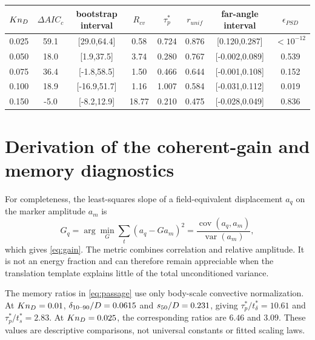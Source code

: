 \begin{center}
\label{tab:fullcov}
\scriptsize
\begin{tabular}{cccccccc}
\toprule
$Kn_D$ & $\Delta AIC_c$ & bootstrap interval & $R_{cv}$ & $\tau_p^*$ & $r_{unif}$ & far-angle interval & $\epsilon_{PSD}$\\
\midrule
0.025 & 59.1 & [29.0,64.4] & 0.58 & 0.724 & 0.876 & [0.120,0.287] & $<10^{-12}$\\
0.050 & 18.0 & [1.9,37.5] & 3.74 & 0.280 & 0.767 & [-0.002,0.089] & 0.539\\
0.075 & 36.4 & [-1.8,58.5] & 1.50 & 0.466 & 0.644 & [-0.001,0.108] & 0.152\\
0.100 & 18.9 & [-16.9,51.7] & 1.16 & 1.007 & 0.584 & [-0.031,0.112] & 0.019\\
0.150 & -5.0 & [-8.2,12.9] & 18.77 & 0.210 & 0.475 & [-0.028,0.049] & 0.836\\
\bottomrule
\end{tabular}
\end{center}

\section{Derivation of the coherent-gain and memory diagnostics}
For completeness, the least-squares slope of a field-equivalent displacement $a_q$ on the marker amplitude $a_m$ is
\begin{equation}
 \widehat G_q=\arg\min_G\sum_t(a_q-Ga_m)^2
 =\frac{\operatorname{cov}(a_q,a_m)}{\operatorname{var}(a_m)},
\end{equation}
which gives \cref{eq:gain}. The metric combines correlation and relative amplitude. It is not an energy fraction and can therefore remain appreciable when the translation template explains little of the total unconditioned variance.

The memory ratios in \cref{eq:passage} use only body-scale convective normalization. At $Kn_D=0.01$, $\delta_{10\text{--}90}/D=0.0615$ and $s_{50}/D=0.231$, giving $\tau_p^*/t_\delta^*=10.61$ and $\tau_p^*/t_s^*=2.83$. At $Kn_D=0.025$, the corresponding ratios are $6.46$ and $3.09$. These values are descriptive comparisons, not universal constants or fitted scaling laws.

